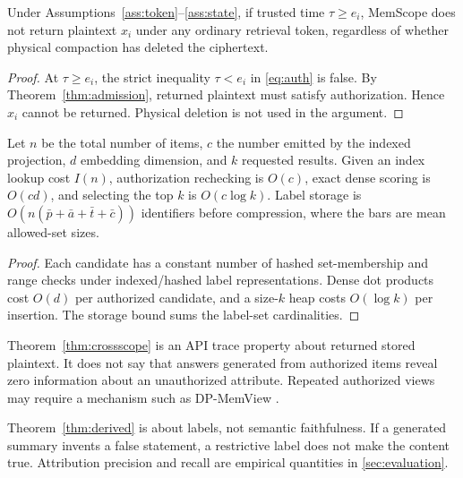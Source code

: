 \begin{theorem}
\label{thm:expiry}
Under Assumptions~\ref{ass:token}--\ref{ass:state}, if trusted time $\tau\ge e_i$, MemScope does not return plaintext $x_i$ under any ordinary retrieval token, regardless of whether physical compaction has deleted the ciphertext.
\end{theorem}
\begin{proof}
At $\tau\ge e_i$, the strict inequality $\tau<e_i$ in \cref{eq:auth} is false. By Theorem~\ref{thm:admission}, returned plaintext must satisfy authorization. Hence $x_i$ cannot be returned. Physical deletion is not used in the argument.
\end{proof}

\begin{proposition}
\label{prop:complexity}
Let $n$ be the total number of items, $c$ the number emitted by the indexed projection, $d$ embedding dimension, and $k$ requested results. Given an index lookup cost $I(n)$, authorization rechecking is $O(c)$, exact dense scoring is $O(cd)$, and selecting the top $k$ is $O(c\log k)$. Label storage is $O(n(\bar p+\bar a+\bar t+\bar c))$ identifiers before compression, where the bars are mean allowed-set sizes.
\end{proposition}
\begin{proof}
Each candidate has a constant number of hashed set-membership and range checks under indexed/hashed label representations. Dense dot products cost $O(d)$ per authorized candidate, and a size-$k$ heap costs $O(\log k)$ per insertion. The storage bound sums the label-set cardinalities.
\end{proof}

\begin{remark}
Theorem~\ref{thm:crossscope} is an API trace property about returned stored plaintext. It does not say that answers generated from authorized items reveal zero information about an unauthorized attribute. Repeated authorized views may require a mechanism such as DP-MemView \citep{kim2026dpmemview}.
\end{remark}

\begin{remark}
Theorem~\ref{thm:derived} is about labels, not semantic faithfulness. If a generated summary invents a false statement, a restrictive label does not make the content true. Attribution precision and recall are empirical quantities in \cref{sec:evaluation}.
\end{remark}


